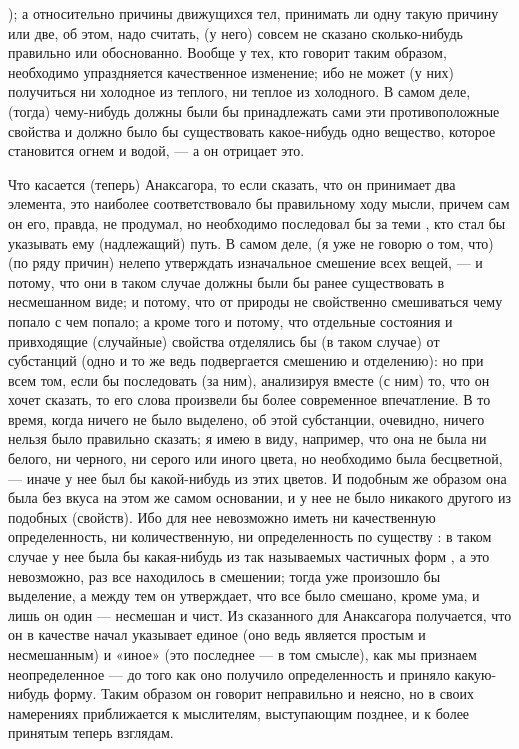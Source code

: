 \documentclass{article}
\begin{document}
\footnotemark[7]
); а относительно причины движущихся тел, принимать ли одну такую причину или две, об этом, надо считать, (у него) совсем не сказано сколько-нибудь правильно или обоснованно. Вообще у тех, кто говорит таким образом, необходимо упраздняется качественное изменение; ибо не может (у них) получиться ни холодное из теплого, ни теплое из холодного. В самом деле, (тогда) чему-нибудь должны были бы принадлежать сами эти противоположные свойства и должно было бы существовать какое-нибудь одно вещество, которое становится огнем и водой, — а он отрицает это.

Что касается (теперь) Анаксагора, то если сказать, что он принимает два элемента, это наиболее соответствовало бы правильному ходу мысли, причем сам он его, правда, не продумал, но необходимо последовал бы за теми
\footnotemark[8]
, кто стал бы указывать ему (надлежащий) путь. В самом деле, (я уже не говорю о том, что) (по ряду причин) нелепо утверждать изначальное смешение всех вещей, — и потому, что они в таком случае должны были бы ранее существовать в несмешанном виде; и потому, что от природы не свойственно смешиваться чему попало с чем попало; а кроме того и потому, что отдельные состояния и привходящие (случайные) свойства отделялись бы (в таком случае) от субстанций (одно и то же ведь подвергается смешению и отделению): но при всем том, если бы последовать (за ним), анализируя вместе (с ним) то, что он хочет сказать, то его слова произвели бы более современное впечатление. В то время, когда ничего не было выделено, об этой субстанции, очевидно, ничего нельзя было правильно сказать; я имею в виду, например, что она не была ни белого, ни черного, ни серого или иного цвета, но необходимо была бесцветной, — иначе у нее был бы какой-нибудь из этих цветов. И подобным же образом она была без вкуса на этом же самом основании, и у нее не было никакого другого из подобных (свойств). Ибо для нее невозможно иметь ни качественную определенность, ни количественную, ни определенность по существу
\footnotemark[9]
: в таком случае у нее была бы какая-нибудь из так называемых частичных форм
\footnotemark[10]
, а это невозможно, раз все находилось в смешении; тогда уже произошло бы выделение, а между тем он утверждает, что все было смешано, кроме ума, и лишь он один — несмешан и чист. Из сказанного для Анаксагора получается, что он в качестве начал указывает единое (оно ведь является простым и несмешанным) и «иное» (это последнее — в том смысле), как мы признаем
\footnotemark[11]
неопределенное — до того как оно получило определенность и приняло какую-нибудь форму. Таким образом он говорит неправильно и неясно, но в своих намерениях приближается к мыслителям, выступающим позднее, и к более принятым теперь взглядам.
\footnotemark[12]
\end{document}
